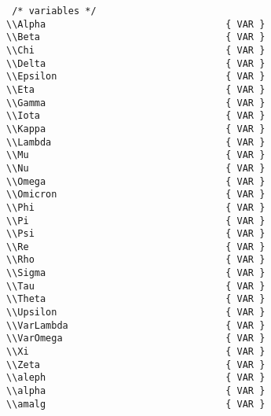 \begin{verbatim}
 /* variables */
\\Alpha                                { VAR } 
\\Beta                                 { VAR } 
\\Chi                                  { VAR } 
\\Delta                                { VAR } 
\\Epsilon                              { VAR } 
\\Eta                                  { VAR } 
\\Gamma                                { VAR } 
\\Iota                                 { VAR }
\\Kappa                                { VAR }
\\Lambda                               { VAR } 
\\Mu                                   { VAR } 
\\Nu                                   { VAR } 
\\Omega                                { VAR } 
\\Omicron                              { VAR }
\\Phi                                  { VAR } 
\\Pi                                   { VAR } 
\\Psi                                  { VAR } 
\\Re                                   { VAR }
\\Rho                                  { VAR } 
\\Sigma                                { VAR } 
\\Tau                                  { VAR } 
\\Theta                                { VAR } 
\\Upsilon                              { VAR } 
\\VarLambda                            { VAR } 
\\VarOmega                             { VAR } 
\\Xi                                   { VAR } 
\\Zeta                                 { VAR }
\\aleph                                { VAR }
\\alpha                                { VAR } 
\\amalg                                { VAR }

\end{verbatim}

